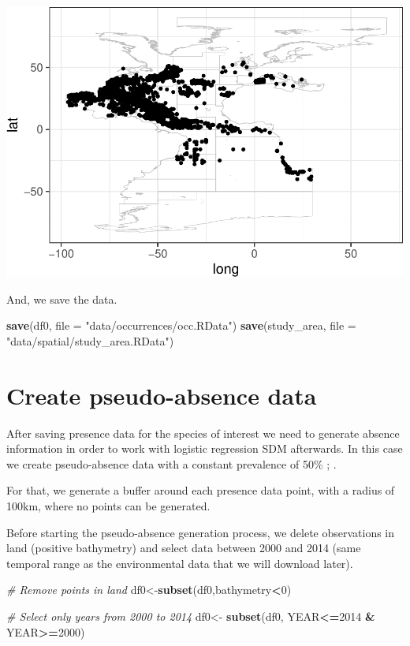 \documentclass[
]{book}
\newenvironment{Shaded}{\begin{snugshade}}{\end{snugshade}}
\newcommand{\AttributeTok}[1]{\textcolor[rgb]{0.13,0.29,0.53}{#1}}
\newcommand{\CommentTok}[1]{\textcolor[rgb]{0.56,0.35,0.01}{\textit{#1}}}
\newcommand{\DecValTok}[1]{\textcolor[rgb]{0.00,0.00,0.81}{#1}}
\newcommand{\FunctionTok}[1]{\textcolor[rgb]{0.13,0.29,0.53}{\textbf{#1}}}
\newcommand{\NormalTok}[1]{#1}
\newcommand{\OtherTok}[1]{\textcolor[rgb]{0.56,0.35,0.01}{#1}}
\newcommand{\SpecialCharTok}[1]{\textcolor[rgb]{0.81,0.36,0.00}{\textbf{#1}}}
\newcommand{\StringTok}[1]{\textcolor[rgb]{0.31,0.60,0.02}{#1}}
\begin{document}
\includegraphics{_main_files/figure-latex/unnamed-chunk-13-1.pdf}

And, we save the data.

\begin{Shaded}
\begin{Highlighting}[]
\FunctionTok{save}\NormalTok{(df0, }\AttributeTok{file =} \StringTok{"data/occurrences/occ.RData"}\NormalTok{)}
\FunctionTok{save}\NormalTok{(study\_area, }\AttributeTok{file =} \StringTok{"data/spatial/study\_area.RData"}\NormalTok{)}
\end{Highlighting}
\end{Shaded}

\section{Create pseudo-absence data}\label{create-pseudo-absence-data}

After saving presence data for the species of interest we need to generate absence information in order to work with logistic regression SDM afterwards. In this case we create pseudo-absence data with a constant prevalence of 50\% \citep{mcpherson_2004}; \citep{barbetmassin_etal_2012}.

For that, we generate a buffer around each presence data point, with a radius of 100km, where no points can be generated.

Before starting the pseudo-absence generation process, we delete observations in land (positive bathymetry) and select data between 2000 and 2014 (same temporal range as the environmental data that we will download later).

\begin{Shaded}
\begin{Highlighting}[]
\CommentTok{\# Remove points in land}
\NormalTok{df0}\OtherTok{\textless{}{-}}\FunctionTok{subset}\NormalTok{(df0,bathymetry}\SpecialCharTok{\textless{}}\DecValTok{0}\NormalTok{)}

\CommentTok{\# Select only years from 2000 to 2014}
\NormalTok{df0}\OtherTok{\textless{}{-}} \FunctionTok{subset}\NormalTok{(df0, YEAR}\SpecialCharTok{\textless{}=}\DecValTok{2014} \SpecialCharTok{\&}\NormalTok{ YEAR}\SpecialCharTok{\textgreater{}=}\DecValTok{2000}\NormalTok{)}
\end{Highlighting}
\end{Shaded}
\end{document}
